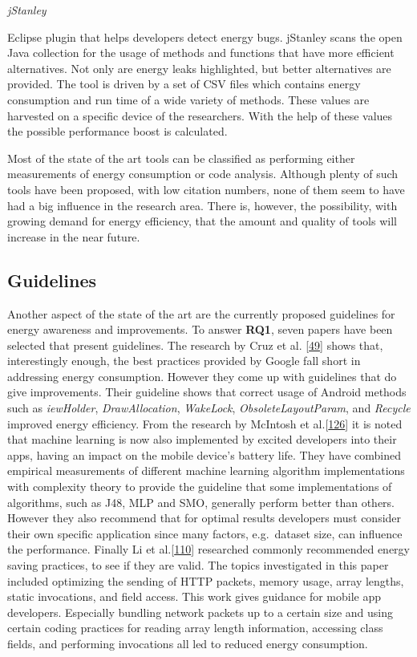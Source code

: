 \documentclass[]{book}
\begin{document}
\emph{jStanley}

Eclipse plugin that helps developers detect energy bugs. jStanley scans
the open Java collection for the usage of methods and functions that
have more efficient alternatives. Not only are energy leaks highlighted,
but better alternatives are provided. The tool is driven by a set of CSV
files which contains energy consumption and run time of a wide variety
of methods. These values are harvested on a specific device of the
researchers. With the help of these values the possible performance
boost is calculated.

Most of the state of the art tools can be classified as performing
either measurements of energy consumption or code analysis. Although
plenty of such tools have been proposed, with low citation numbers, none
of them seem to have had a big influence in the research area. There is,
however, the possibility, with growing demand for energy efficiency,
that the amount and quality of tools will increase in the near future.

\subsection{Guidelines}\label{guidelines}

Another aspect of the state of the art are the currently proposed
guidelines for energy awareness and improvements. To answer
\textbf{RQ1}, seven papers have been selected that present guidelines.
The research by Cruz et al. {[}\protect\hyperlink{ref-CA2017}{49}{]}
shows that, interestingly enough, the best practices provided by Google
fall short in addressing energy consumption. However they come up with
guidelines that do give improvements. Their guideline shows that correct
usage of Android methods such as \emph{iewHolder},
\emph{DrawAllocation}, \emph{WakeLock}, \emph{ObsoleteLayoutParam}, and
\emph{Recycle} improved energy efficiency. From the research by McIntosh
et al.{[}\protect\hyperlink{ref-MSA2018}{126}{]} it is noted that
machine learning is now also implemented by excited developers into
their apps, having an impact on the mobile device's battery life. They
have combined empirical measurements of different machine learning
algorithm implementations with complexity theory to provide the
guideline that some implementations of algorithms, such as J48, MLP and
SMO, generally perform better than others. However they also recommend
that for optimal results developers must consider their own specific
application since many factors, e.g.~dataset size, can influence the
performance. Finally Li et al.{[}\protect\hyperlink{ref-LH2014}{110}{]}
researched commonly recommended energy saving practices, to see if they
are valid. The topics investigated in this paper included optimizing the
sending of HTTP packets, memory usage, array lengths, static
invocations, and field access. This work gives guidance for mobile app
developers. Especially bundling network packets up to a certain size and
using certain coding practices for reading array length information,
accessing class fields, and performing invocations all led to reduced
energy consumption.
\end{document}
